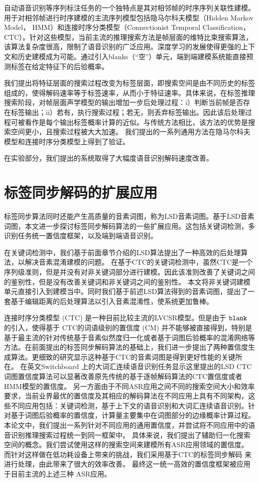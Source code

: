 自动语音识别等序列标注任务的一个独特点是其对相邻帧的时序序列关联性建模。用于对相邻帧进行时序建模的主流序列模型包括隐马尔科夫模型（Hidden Markov Model， HMM）和连接时序分类模型（Connectionist Temporal Classification， CTC）。针对这些模型，当前主流的推理搜索方法是帧层面的维特比束搜索算法，该算法复杂度很高，限制了语音识别的广泛应用。深度学习的发展使得更强的上下文和历史建模成为可能。通过引入blanks（“空”）单元，端到端建模系统能直接预测标签在给定特征下的后验概率。

我们提出将特征层面的搜索过程改变为标签层面，即搜索空间是由不同历史的标签组成的，使得解码速率等于标签速率，从而小于特征速率。具体来说，在标签推理搜索阶段，对帧层面声学模型的输出增加一步后处理过程：i）判断当前帧是否存在标签输出；ii）若有，执行搜索过程；若无，则丢弃标签输出。因此该后处理过程可被看作是每个输出标签概率计算的近似。与传统方法相比，该方法的优势是搜索空间更小，且搜索过程被大大加速。
我们提出的一系列通用方法在隐马尔科夫模型和连接时序分类模型上得到了验证。
%

在实验部分，我们提出的系统取得了大幅度语音识别解码速度改善。


\section{标签同步解码的扩展应用}
\label{chap:sum-unify}
标签同步算法同时还能产生高质量的音素词图，称为LSD音素词图。基于LSD音素词图，本文进一步探讨标签同步解码算法的一些扩展应用。这包括关键词检测，多识别任务统一置信度框架，以及端到端语音识别。

在关键词检测中，我们基于前面章节介绍的LSD算法提出了一种高效的后处理算法，以解决音素混淆建模的问题。
在基于CTC的关键词检测中，虽然CTC是一个序列级准则，但是并没有对非关键词部分进行建模。因此该准则改善了关键词之间的鉴别性，但是没有改善关键词和非关键词之间的鉴别性。
本文将非关键词建模单元直接引入到建模当中。同时我们基于前述LSD算法得到的音素词图，提出了一套基于编辑距离的后处理算法以引入音素混淆性，使系统更加鲁棒。

连接时序分类模型 (CTC) 是一种目前比较主流的LVCSR模型。但是由于 $\tt blank$ 的引入，使得基于 CTC的词语级别的置信度 (CM) 并不能够被直接得到，特别是基于最主流的针对传统基于音素似然度归一化或者基于词图后验概率的混淆网络等方法。在前面提出的标签同步解码算法的基础上，我们进一步提出了两种置信度生成算法。更细致的研究显示这种基于CTC的音素词图是得到更好性能的关键所在。
在英文Switchboard 上的大词汇连续语音识别任务显示这里提出的LSD CTC 词图置信度算法可以显著改善原先传统的基于逐帧解码算法的CTC置信度或者 HMM模型的置信度。
%
另一方面由于不同ASR应用之间不同的搜索空间大小和效率要求，当前业界最优的置信度及其相应的解码算法在不同应用上具有不同架构，这些不同应用包括：关键词检测，基于上下文的语音识别和大词汇连续语音识别。针对基于词图后验概率的置信度，计算量主要集中在词图部分的边缘概率计算过程。本论文中，我们提出一系列针对不同应用的通用置信度，并尝试将不同应用中的语音识别推理搜索过程统一到同一框架中。
%
具体来说，我们提出了辅助归一化搜索空间的概念。我们尝试使用这样的搜索空间来建模所有ASR应用领域的置信度。 %
而针对这样做在低功耗设备上带来的挑战，我们采用基于CTC的标签同步解码\cite{Chen+2016} 来进行处理，由此带来了很大的效率改善。
最终这一统一高效的置信度框架被应用于目前主流的上述三种 ASR应用。

